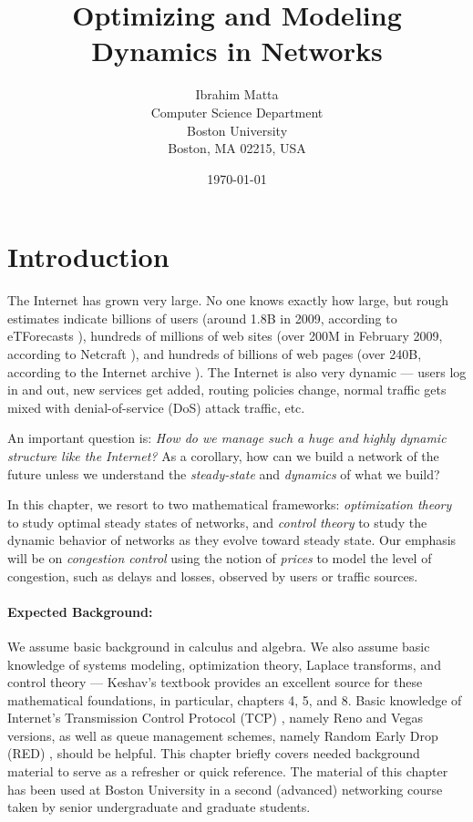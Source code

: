 \documentclass{article}
\title{Optimizing and Modeling Dynamics in Networks}
\author{{\sc Ibrahim Matta} \\
Computer Science Department \\
Boston University \\
Boston, MA 02215, USA}
\date{\today}							%
\begin{document}
\maketitle

\tableofcontents

\section{Introduction}

The Internet has grown very large. No one knows exactly how large, but rough estimates indicate billions of users (around 1.8B in 2009, according to eTForecasts \cite{eTForecasts}), hundreds of millions of web sites (over 200M in February 2009, according to Netcraft \cite{Netcraft}), and hundreds of billions of web pages (over 240B, according to the Internet archive \cite{Internet-archive}).
The Internet is also very dynamic --- users log in and out, new services get added, routing policies change, normal traffic gets mixed with denial-of-service (DoS) attack traffic, etc.

An important question is: {\em How do we manage such a huge and highly dynamic structure like the Internet?}
As a corollary, how can we build a network of the future unless we understand the {\em steady-state} and {\em dynamics} of what we build?

In this chapter, we resort to two mathematical frameworks: {\em optimization theory} to study optimal steady states of networks, and {\em control theory} to study the dynamic behavior of networks as they evolve toward steady state. Our emphasis will be on {\em congestion control} using the notion of {\em prices} to model the level of congestion, such as delays and losses, observed by users or traffic sources.

\paragraph{Expected Background:} We assume basic background in calculus and algebra.
We also assume basic knowledge of systems modeling, optimization theory, Laplace transforms, and control theory --- Keshav's textbook \cite{Keshav:2010} provides an excellent source for these mathematical foundations,
in particular, chapters 4, 5, and 8.
Basic knowledge of Internet's Transmission Control Protocol (TCP) \cite{tcp:1988},
namely Reno and Vegas \cite{vegas:1995} versions,
as well as queue management schemes, namely Random Early Drop (RED) \cite{red:1993},
should be helpful.
This chapter briefly covers needed background material to serve as a refresher or quick reference.
The material of this chapter has been used at Boston University in a second (advanced) networking course
taken by senior undergraduate and graduate students.
\end{document}
